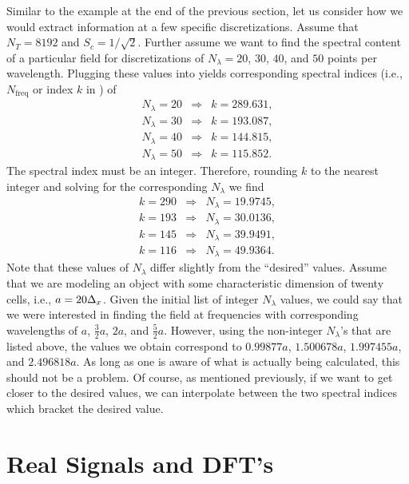 Similar to the example at the end of the previous section, let us
consider how we would extract information at a few specific
discretizations.  Assume that $N_T = 8192$ and $S_c=1/\sqrt{2}$.
Further assume we want to find the spectral content of a particular
field for discretizations of $N_\lambda = 20$, $30$, $40$, and $50$
points per wavelength.  Plugging these values into
 yields corresponding spectral indices
(i.e., $N_{\mathrm{freq}}$ or index $k$ in ) of
\begin{eqnarray*}
N_\lambda = 20 &\Rightarrow& k = 289.631, \\
N_\lambda = 30 &\Rightarrow& k = 193.087, \\
N_\lambda = 40 &\Rightarrow& k = 144.815, \\
N_\lambda = 50 &\Rightarrow& k = 115.852. 
\end{eqnarray*}
The spectral index must be an integer.  Therefore, rounding $k$ to the
nearest integer and solving for the corresponding $N_\lambda$ we find
\begin{eqnarray*}
k = 290 & \Rightarrow & N_\lambda = 19.9745, \\ 
k = 193 & \Rightarrow & N_\lambda = 30.0136, \\ 
k = 145 & \Rightarrow & N_\lambda = 39.9491, \\ 
k = 116 & \Rightarrow & N_\lambda = 49.9364. 
\end{eqnarray*}
Note that these values of $N_\lambda$ differ slightly from the
``desired'' values.  Assume that we are modeling an object with some
characteristic dimension of twenty cells, i.e., $a = 20\Delta_x$.  Given
the initial list of integer $N_\lambda$ values, we could say that we
were interested in finding the field at frequencies with corresponding
wavelengths of $a$, $\frac{3}{2}a$, $2a$, and $\frac{5}{2}a$.
However, using the non-integer $N_\lambda$'s that are listed above,
the values we obtain correspond to $0.99877 a$, $1.500678a$, $1.997455
a$, and $2.496818 a$.  As long as one is aware of what is actually
being calculated, this should not be a problem.  Of course, as
mentioned previously, if we want to get closer to the desired values,
we can interpolate between the two spectral indices which bracket the
desired value.

\section{Real Signals and DFT's}

